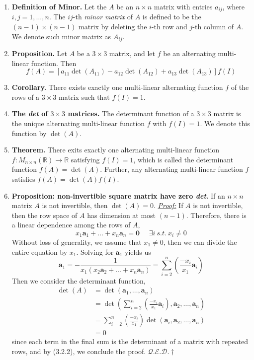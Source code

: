 \documentclass[oneside, 12pt]{book}
\newcommand{\settag}[1]{\renewcommand{\theenumi}{#1}}
\newcommand{\R}{\mathbb{R}}
\newcommand{\qed}{\hfill $\mathcal{Q}.\mathcal{E}.\mathcal{D}.\dagger$}
\newcommand{\tbf}[1]{\textbf{#1}}
\newcommand{\tit}[1]{\textit{#1}}
\newcommand{\proof}{\tit{\underline{Proof:}}} %
\newcommand{\trans}[3]{$#1:#2\rightarrow{}#3$}
\newcommand{\para}[1]{\item \tbf{#1}}
\newcommand{\va}{\mathbf{a}}
\begin{document}
\begin{enumerate}
    \settag{3.2.4}
    \para{Definition of Minor.} Let the $A$ be an $n\times n$ matrix with entries $a_{ij}$, where $i, j = 1, \ldots, n$. The $ij$-th \tit{minor matrix} of $A$ is defined to be the $(n-1) \times (n -1)$ matrix by deleting the $i$-th row and $j$-th column of $A$. We denote such minor matrix as $A_{ij}$.
    
    \settag{3.2.5}
    \para{Proposition.} Let $A$ be a $3 \times 3$ matrix, and let $f$ be an alternating multi-linear function. Then
    \begin{equation*}
        f(A) = \left[a_{11}\det(A_{11}) - a_{12}\det(A_{12}) + a_{13}\det(A_{13})\right]f(I)
    \end{equation*}
    
    \settag{3.2.6}
    \para{Corollary.} There exists exactly one multi-linear alternating function $f$ of the rows of a $3 \times 3$ matrix such that $f(I) = 1$.
    
    \settag{3.2.7}
    \para{The \tit{det} of $3 \times 3$ matrices.} The determinant function of a $3 \times 3$ matrix is the unique alternating multi-linear function $f$ with $f(I) = 1$. We denote this function by $\det{(A)}$.
    
    \settag{3.2.8}
    \para{Theorem.} There exits exactly one alternating multi-linear function \trans{f}{M_{n\times n}(\R)}{\R} satisfying $f(I) = 1$, which is called the determinant function $f(A) = \det(A)$. Further, any alternating multi-linear function $f$ satisfies $f(A) = \det(A)f(I)$.
    
    \settag{3.2.10}
    \para{Proposition: non-invertible square matrix have zero \tit{det}.} If an $n \times n$ matrix $A$ is not invertible, then $\det(A) = 0$. \newline
    \proof \newline
    If $A$ is not invertible, then the row space of $A$ has dimension at most $(n - 1)$. Therefore, there is a linear dependence among the rows of $A$, 
    \begin{equation*}
        x_1\va_1 + \ldots + x_n\va_n = \mathbf{0}~~~~~~\exists i~s.t.~ x_i \neq 0
    \end{equation*}
    Without loss of generality, we assume that $x_1 \neq 0$, then we can divide the entire equation by $x_1$. Solving for $\va_1$ yields us 
    \begin{equation*}
        \va_1 = -\frac{1}{x_1(x_2\va_2 + \ldots + x_n\va_n)} = \sum_{i = 2}^{n}\left(\frac{-x_i}{x_1}\va_i\right)
    \end{equation*}
    Then we consider the determinant function, 
    \begin{align*}
        \det(A) &= \det(\va_1,\ldots,\va_n) \\
        &= \det\left(\sum_{i = 2}^{n}\left(\frac{-x_i}{x_1}\va_i\right), \va_2, \ldots, \va_n\right) \\
        &= \sum_{i = 2}^{n} \left(\frac{-x_i}{x_1}\right)\det(\va_i, \va_2,\ldots,\va_n) \\
        &= 0
    \end{align*}
    since each term in the final sum is the determinant of a matrix with repeated rows, and by (3.2.2), we conclude the proof. \qed
    

\end{enumerate}
\end{document}
